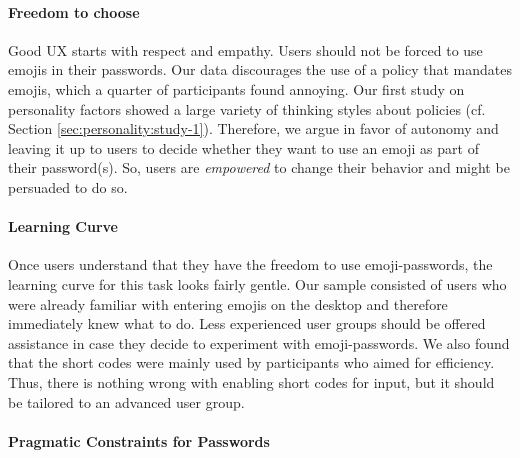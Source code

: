\paragraph{Freedom to choose} Good UX starts with respect and empathy. Users should not be forced to use emojis in their passwords. Our data discourages the use of a policy that mandates emojis, which a quarter of participants found annoying. Our first study on personality factors showed a large variety of thinking styles about policies (cf. Section \ref{sec:personality:study-1}). Therefore, we argue in favor of autonomy and leaving it up to users to decide whether they want to use an emoji as part of their password(s). So, users are \textit{empowered} to change their behavior and might be persuaded to do so. 

\paragraph{Learning Curve} Once users understand that they have the freedom to use emoji-passwords, the learning curve for this task looks fairly gentle. Our sample consisted of users who were already familiar with entering emojis on the desktop and therefore immediately knew what to do. Less experienced user groups should be offered assistance in case they decide to experiment with emoji-passwords. We also found that the short codes were mainly used by participants who aimed for efficiency. Thus, there is nothing wrong with enabling short codes for input, but it should be tailored to an advanced user group. 


\paragraph{Pragmatic Constraints for Passwords}\label{sec:emojipasswords:unique-constraints} 

